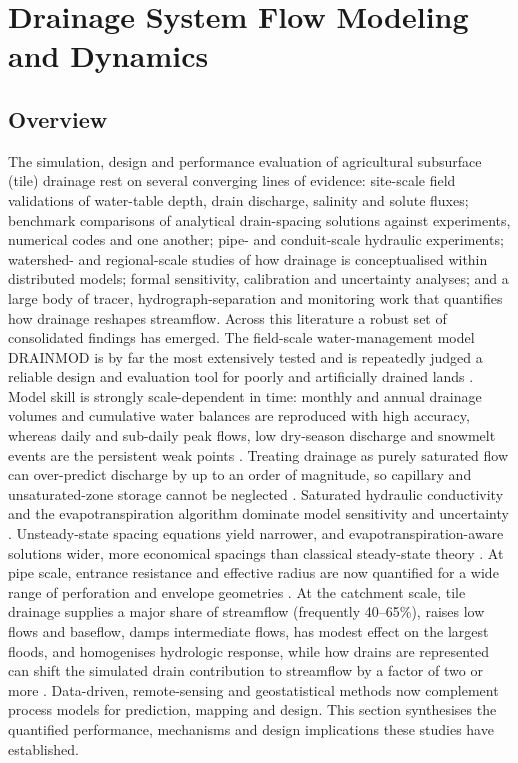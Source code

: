 \documentclass[11pt]{article}
\begin{document}
\section*{Drainage System Flow Modeling and Dynamics}

\subsection{Overview}

The simulation, design and performance evaluation of agricultural subsurface (tile) drainage rest on several converging lines of evidence: site-scale field validations of water-table depth, drain discharge, salinity and solute fluxes; benchmark comparisons of analytical drain-spacing solutions against experiments, numerical codes and one another; pipe- and conduit-scale hydraulic experiments; watershed- and regional-scale studies of how drainage is conceptualised within distributed models; formal sensitivity, calibration and uncertainty analyses; and a large body of tracer, hydrograph-separation and monitoring work that quantifies how drainage reshapes streamflow. Across this literature a robust set of consolidated findings has emerged. The field-scale water-management model \textsc{DRAINMOD} is by far the most extensively tested and is repeatedly judged a reliable design and evaluation tool for poorly and artificially drained lands \parencite{Singh2019b,Gowda2012}. Model skill is strongly scale-dependent in time: monthly and annual drainage volumes and cumulative water balances are reproduced with high accuracy, whereas daily and sub-daily peak flows, low dry-season discharge and snowmelt events are the persistent weak points \parencite{Gowda2012,Dayyani2009,Morrison2014,Varvaris2018}. Treating drainage as purely saturated flow can over-predict discharge by up to an order of magnitude, so capillary and unsaturated-zone storage cannot be neglected \parencite{Xin2016b}. Saturated hydraulic conductivity and the evapotranspiration algorithm dominate model sensitivity and uncertainty \parencite{NabiSichani2012,Malakshahi2020,Wang2006}. Unsteady-state spacing equations yield narrower, and evapotranspiration-aware solutions wider, more economical spacings than classical steady-state theory \parencite{OOSTERBAAN1988,NIKAM1992}. At pipe scale, entrance resistance and effective radius are now quantified for a wide range of perforation and envelope geometries \parencite{Ghane2022,Ghane2022b}. At the catchment scale, tile drainage supplies a major share of streamflow (frequently 40--65\%), raises low flows and baseflow, damps intermediate flows, has modest effect on the largest floods, and homogenises hydrologic response, while how drains are represented can shift the simulated drain contribution to streamflow by a factor of two or more \parencite{King2014,Schilling2008,Sloan2017,BolandBrien2014,Karan2021,Boico2022}. Data-driven, remote-sensing and geostatistical methods now complement process models for prediction, mapping and design. This section synthesises the quantified performance, mechanisms and design implications these studies have established.
\end{document}
